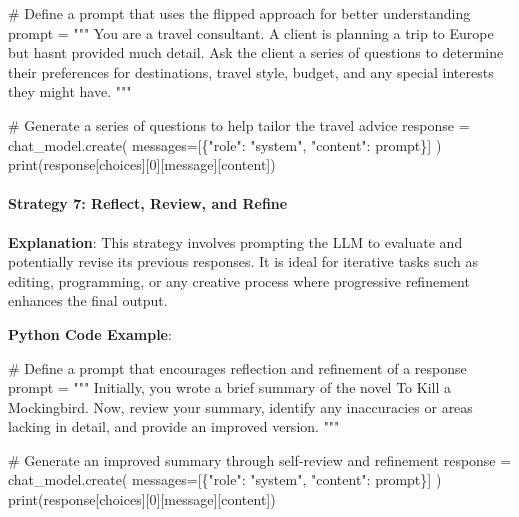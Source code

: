 \documentclass[
]{agujournal2019}
\let\oldparagraph\paragraph
\renewcommand{\paragraph}[1]{\oldparagraph{#1}\mbox{}}
\newenvironment{Shaded}{\begin{snugshade}}{\end{snugshade}}
\newcommand{\BuiltInTok}[1]{\textcolor[rgb]{0.00,0.23,0.31}{#1}}
\newcommand{\CommentTok}[1]{\textcolor[rgb]{0.37,0.37,0.37}{#1}}
\newcommand{\DecValTok}[1]{\textcolor[rgb]{0.68,0.00,0.00}{#1}}
\newcommand{\NormalTok}[1]{\textcolor[rgb]{0.00,0.23,0.31}{#1}}
\newcommand{\OperatorTok}[1]{\textcolor[rgb]{0.37,0.37,0.37}{#1}}
\newcommand{\StringTok}[1]{\textcolor[rgb]{0.13,0.47,0.30}{#1}}
\begin{document}
\begin{Shaded}
\begin{Highlighting}[]
\CommentTok{\# Define a prompt that uses the flipped approach for better understanding}
\NormalTok{prompt }\OperatorTok{=} \StringTok{"""}
\StringTok{You are a travel consultant. A client is planning a trip to Europe but hasn\textquotesingle{}t provided much detail. Ask the client a series of questions to determine their preferences for destinations, travel style, budget, and any special interests they might have.}
\StringTok{"""}

\CommentTok{\# Generate a series of questions to help tailor the travel advice}
\NormalTok{response }\OperatorTok{=}\NormalTok{ chat\_model.create(}
\NormalTok{    messages}\OperatorTok{=}\NormalTok{[\{}\StringTok{"role"}\NormalTok{: }\StringTok{"system"}\NormalTok{, }\StringTok{"content"}\NormalTok{: prompt\}]}
\NormalTok{)}
\BuiltInTok{print}\NormalTok{(response[}\StringTok{\textquotesingle{}choices\textquotesingle{}}\NormalTok{][}\DecValTok{0}\NormalTok{][}\StringTok{\textquotesingle{}message\textquotesingle{}}\NormalTok{][}\StringTok{\textquotesingle{}content\textquotesingle{}}\NormalTok{])}
\end{Highlighting}
\end{Shaded}

\paragraph{Strategy 7: Reflect, Review, and
Refine}\label{strategy-7-reflect-review-and-refine}

\textbf{Explanation}: This strategy involves prompting the LLM to
evaluate and potentially revise its previous responses. It is ideal for
iterative tasks such as editing, programming, or any creative process
where progressive refinement enhances the final output.

\textbf{Python Code Example}:

\begin{Shaded}
\begin{Highlighting}[]
\CommentTok{\# Define a prompt that encourages reflection and refinement of a response}
\NormalTok{prompt }\OperatorTok{=} \StringTok{"""}
\StringTok{Initially, you wrote a brief summary of the novel \textquotesingle{}To Kill a Mockingbird\textquotesingle{}. Now, review your summary, identify any inaccuracies or areas lacking in detail, and provide an improved version.}
\StringTok{"""}

\CommentTok{\# Generate an improved summary through self{-}review and refinement}
\NormalTok{response }\OperatorTok{=}\NormalTok{ chat\_model.create(}
\NormalTok{    messages}\OperatorTok{=}\NormalTok{[\{}\StringTok{"role"}\NormalTok{: }\StringTok{"system"}\NormalTok{, }\StringTok{"content"}\NormalTok{: prompt\}]}
\NormalTok{)}
\BuiltInTok{print}\NormalTok{(response[}\StringTok{\textquotesingle{}choices\textquotesingle{}}\NormalTok{][}\DecValTok{0}\NormalTok{][}\StringTok{\textquotesingle{}message\textquotesingle{}}\NormalTok{][}\StringTok{\textquotesingle{}content\textquotesingle{}}\NormalTok{])}
\end{Highlighting}
\end{Shaded}
\end{document}
